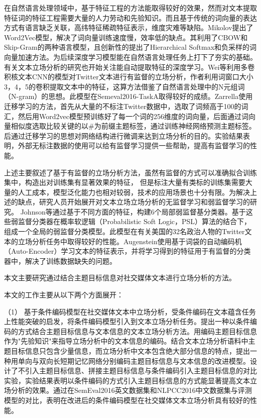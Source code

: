 在自然语言处理领域中，基于特征工程的方法能取得较好的效果，然而对文本提取特征词的特征工程需要大量的人力劳动和先验知识。而且基于传统的词向量的表达方式有语言缺乏关联，高纬特征稀疏特征表示，维度灾难等缺陷。Mikolov提出了Word2Vec模型，解决了词向量训练速度慢，效率低的缺点。其利用了CBOW和Skip-Gram的两种语言模型，且创新性的提出了Hierarchical Softmax和负采样的词向量加速方法。为后续深度学习模型能在自然语言处理任务上打下了夯实的基础。有关文本立场分析的研究也开始关注能自动提取特征的深度学习。Wei\cite{wei2016pkudblab}等利用多卷积核文本CNN的模型对Twitter文本进行有监督的立场分析，作者利用词窗口大小3，4，5的卷积提取文本中的特征，这算方法借鉴了自然语言处理中的N元组词（N-gram）的思想。此模型在Semeval2016-TaskA取得较好的成绩。Zarrella使用迁移学习的方法，首先从大量的不标注Twitter数据中，选取了词频高于100的词汇，然后用Word2vec模型预训练好了每一个词的256维度的词向量，后面通过词向量相似度选取比较关键的以\#为前缀主题标签，通过训练神经网络预测主题标签。后通过迁移学习的思想对网络结构进行微调来达到立场分析的目的。实验结果表明，外部无标注数据的使用可以给有监督学习提供一些帮助，提高有监督学习的性能。

上述主要叙述了基于有监督的立场分析方法，虽然有监督的方式可以准确拟合训练集中，构造出对训练集有显著效果的特征， 但是标注大量有类标的训练集需要大量的人工成本，模型泛化能力也相对较弱，技术的应用场景也十分有限。为解决上述的缺点，研究人员开始展开对文本立场立场分析的无监督学习和弱监督学习的研究。 Johnson等通过基于不同方面的特征，构建6个局部弱监督基分类器。基于这些弱监督分类器在概率软逻辑（Probabilistic Soft Logic，PSL）算法的结合下，组成一个全局的弱监督分类模型。此模型在有关美国的32名政治人物的Twitter文本的立场分析任务中取得较好的性能。Augenstein使用基于词袋的自动编码机（Auto-Encoder）学习文本的特征表示，并将学习得到的特征用于有监督的分类器中，解决了训练数据缺失的问题。





本文主要研究通过结合主题目标信息对社交媒体文本进行立场分析的方法。

本文的工作主要从以下两个方面展开：

（1） 基于条件编码模型在社交媒体文本中立场分析，受条件编码在文本蕴含任务上性能突破的启发，将条件编码模型引入到文本立场分析任务。提出一种以条件编码的方式结合主题目标信息与文本信息的文本立场分析方法。用编码主题目标信息作为"先验知识"来指导立场分析中的文本信息的编码。结合文本立场分析语料中主题目标信息只包含少量信息，而立场分析中文本包含绝大部分信息的特点，提出一种用单向与双向长短期记忆网络分别编码主题目标信息与文本信息的改进模型。设计了不引入主题目标信息、拼接主题目标信息与条件编码引入主题目标信息的对比实验，实验结果表明以条件编码的方式引入主题目标信息的方式能显著提高文本立场分析的效果。通过在SemEval2016英文数据集和NLPCC2016中文数据集与评测模型的对比，表明在改进后的条件编码模型在社交媒体文本立场分析具有较好的性能。


